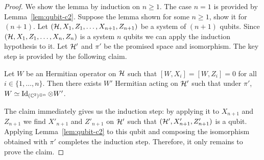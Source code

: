 \begin{proof}
We show the lemma by induction on $n\geq 1$. The case $n=1$ is provided by Lemma~\ref{lem:qubit-c2}. Suppose the lemma shown for some $n\geq 1$, show it for $(n+1)$. Let $(\mathcal{H},X_1,Z_1,\ldots,X_{n+1},Z_{n+1})$ be a system of $(n+1)$ qubits. Since $(\mathcal{H},X_1,Z_1,\ldots,X_n,Z_n)$ is a system $n$ qubits we can apply the induction hypothesis to it. Let $\mathcal{H}'$ and $\pi'$ be the promised space and isomorphism. The key step is provided by the following claim.

\begin{claim}\label{claim:n-qubit-c2}
Let $W$ be an Hermitian operator on $\mathcal{H}$ such that $[W,X_i]=[W,Z_i]=0$ for all $i\in \{1,\ldots,n\}$. Then there exists $W'$ Hermitian acting on $\mathcal{H}'$ such that under $\pi'$, $W\simeq \mathop{\rm Id}\nolimits_{(\mathbb{C}^2)^{\otimes n}} \otimes W'$. 
\end{claim}

The claim immediately gives us the induction step: by applying it to $X_{n+1}$ and $Z_{n+1}$ we find $X'_{n+1}$ and $Z'_{n+1}$ on $\mathcal{H}'$ such that $(\mathcal{H}',X'_{n+1},Z'_{n+1})$ is a qubit. Applying Lemma~\ref{lem:qubit-c2} to this qubit  and composing the isomorphism obtained with $\pi'$ completes the induction step. Therefore, it only remains to prove the claim. 


\end{proof}
